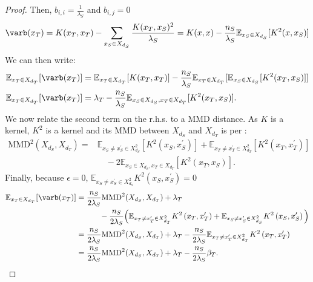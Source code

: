 \begin{proof}
Then, $b_{i,i}=\frac{1}{\lambda_S}$ and $b_{i,j}=0$ \sut
$$
    \varb(x_T)=K(x_T, x_T)-\sum_{x_S\in X_{d_S}} \frac{K(x_T, x_S)^2}{\lambda_S}=K(x,x) - \frac{n_S}{\lambda_S} \mathbb{E}_{x_S\in X_{d_S}}[K^2(x, x_S)]
$$
We can then write:
\begin{align*}
    &\mathbb{E}_{x_T\in X_{d_T}} [\varb(x_T)] = \mathbb{E}_{x_T\in X_{d_T}}[K(x_T, x_T)] - \frac{n_S}{\lambda_S} \mathbb{E}_{x_T\in X_{d_T}}[\mathbb{E}_{x_S\in X_{d_S}}[K^2(x_T, x_S)]] \\
    &\mathbb{E}_{x_T\in X_{d_T}} [\varb(x_T)] = \lambda_T - \frac{n_S}{\lambda_S} \mathbb{E}_{x_S\in X_{d_S}, x_T\in X_{d_T}}[K^2(x_T, x_S)]. \\
\end{align*}
We now relate the second term on the r.h.s. to a MMD distance.
As $K$ is a kernel, $K^2$ is a kernel and its MMD between $X_{d_S}$ and $X_{d_T}$ is per \cite{Gretton2012}:
\begin{align*}
    \text{MMD}^{2}(X_{d_S}, X_{d_T})= & \mathbb{E}_{x_S \neq x_S^\prime \in X_{d_S}^2}[K^2(x_S, x_S^\prime)]+\mathbb{E}_{x_T \neq x_T^\prime \in X_{d_T}^2}[K^2(x_T, x_T^\prime)]\\
    & \quad -2\mathbb{E}_{x_S\in X_{d_S}, x_T\in X_{d_T}}[K^2(x_T, x_S)].
\end{align*}
Finally, because $\epsilon=0$, $\mathbb{E}_{x_S \neq x_S^\prime \in X_{d_S}^2} K^2\left(x_S, x_S^{\prime}\right)=0$ \sut
\begin{align*}
    \mathbb{E}_{x_T\in X_{d_T}}[\varb(x_T)] &=\frac{n_S}{2\lambda_S}\text{MMD}^{2}(X_{d_S}, X_{d_T}) + \lambda_T\\
    & \quad\quad\quad -\frac{n_S}{2\lambda_S}\Big(\mathbb{E}_{x_T \neq x_T^\prime \in X_{d_T}^2} K^2\left(x_T, x_T^{\prime}\right)+\mathbb{E}_{x_S \neq x_S^\prime \in X_{d_S}^2} K^2\left(x_S, x_S^{\prime}\right)\Big) \\
    &=\frac{n_S}{2\lambda_S}\text{MMD}^{2}(X_{d_S}, X_{d_T}) +\lambda_T-\frac{n_S}{2\lambda_S}\mathbb{E}_{x_T \neq x_T^\prime \in X_{d_T}^2} K^2\left(x_T, x_T^{\prime}\right)\\
    &= \frac{n_S}{2\lambda_S}\text{MMD}^{2}(X_{d_S}, X_{d_T}) + \lambda_T - \frac{n_S}{2\lambda_S}\beta_T.
\end{align*}


\end{proof}
